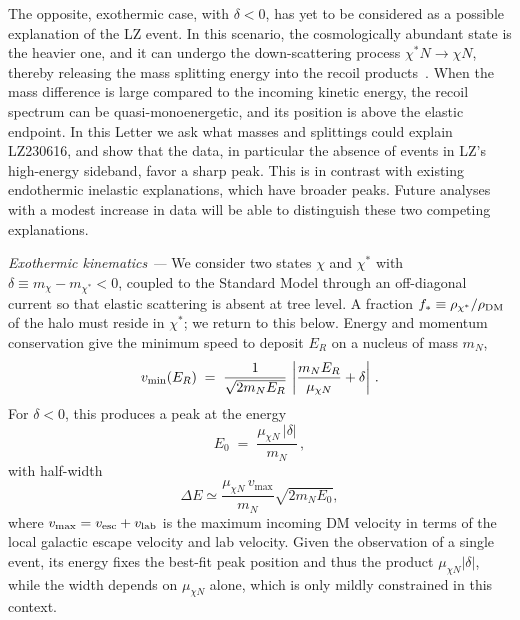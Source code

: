 \documentclass[aps,prl,twocolumn,superscriptaddress,nofootinbib,floatfix,longbibliography]{revtex4-2}
\newcommand{\keV}{\ensuremath{\,\mathrm{keV}}}
\newcommand{\GeV}{\ensuremath{\,\mathrm{GeV}}}
\newcommand{\ER}{\ensuremath{E_R}}
\newcommand{\vmin}{\ensuremath{v_{\rm min}}}
\begin{document}
The opposite, exothermic case, with $\delta<0$, has yet to be considered as a possible explanation of the LZ event. In this scenario, the cosmologically abundant state is the heavier one, and it can undergo the down-scattering process $\chi^{*}N \to \chi N$, thereby releasing the mass splitting energy into the recoil products~\cite{Graham:2010ca,Batell:2009vb,Essig:2009nc}. When the mass difference is large compared to the incoming kinetic energy, the recoil spectrum can be quasi-monoenergetic, and its position is above the elastic endpoint. In this Letter we ask what masses and splittings could explain LZ230616, and show that the data, in particular the absence of events in LZ's high-energy sideband, favor a sharp peak. This is in contrast with existing endothermic inelastic explanations, which have broader peaks. Future analyses with a modest increase in data will be able to distinguish these two competing explanations.

\emph{Exothermic kinematics ---}
We consider two states $\chi$ and $\chi^{*}$ with $\delta \equiv m_\chi - m_{\chi^{*}} < 0$, coupled to the Standard Model through an off-diagonal current so that elastic scattering is absent at tree level. A fraction $f_* \equiv \rho_{\chi^*}/\rho_{\rm DM}$ of the halo must reside in $\chi^*$; we return to this below. Energy and momentum conservation give the minimum speed to deposit $\ER$ on a nucleus of mass $m_N$,
%
\begin{equation}
  \vmin(\ER) \;=\;
  \frac{1}{\sqrt{2 m_N \ER}}\,
  \left| \frac{m_N \ER}{\mu_{\chi N}} + \delta \right| \, .
  \label{eq:vmin}
\end{equation}
%
For $\delta<0$, this produces a peak at the energy
%
\begin{equation}
  E_0 \;=\; \frac{\mu_{\chi N}\,|\delta|}{m_N} \, ,
  \label{eq:E0}
\end{equation}
%
with half-width
%
\begin{equation}
  \Delta E \simeq
  \frac{\mu_{\chi N}\, v_{\mathrm{max}}}{m_N}\sqrt{2 m_N E_0},
  \label{eq:width}
\end{equation}
%
where $v_{\rm max} = v_{\rm esc} + v_{\rm lab}$ is the maximum incoming DM velocity in terms of the local galactic escape velocity and lab velocity. Given the observation of a single event, its energy fixes the best-fit peak position and thus the product $\mu_{\chi N}|\delta|$, while the width depends on $\mu_{\chi N}$ alone, which is only mildly constrained in this context.
\end{document}
